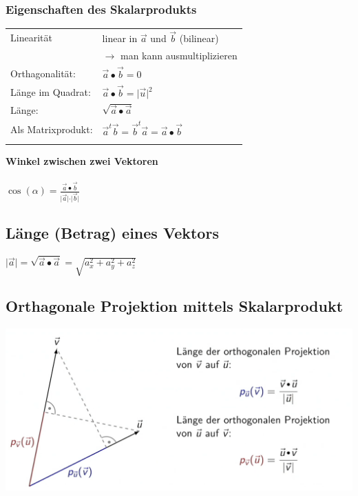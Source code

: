 			

			\subsubsection{Eigenschaften des Skalarprodukts}
			
			\begin{tabular}{ll}
			Linearität & linear in $\vec{a}$ und $\vec{b}$ (bilinear) \\
			& $\rightarrow$ man kann ausmultiplizieren\\
			
			Orthagonalität: &  $\vec{a} \bullet \vec{b} = 0$ \\
			
			Länge im Quadrat: & $\vec{a} \bullet \vec{b} = \vert \vec{u} \vert ^2$ 	\\
						
			Länge: &$\sqrt{\vec{a} \bullet \vec{a}}$ \\
			
			Als Matrixprodukt: & $\vec{a}^t \vec{b} = \vec{b}^t \vec{a} = \vec{a} \bullet \vec{b}$ \\
			\\
			\end{tabular}
			
			\textbf{Winkel zwischen zwei Vektoren} \\
			\\
			$\cos(\alpha) = \frac{\vec{a} \bullet \vec{b}}{ \vert \vec{a} \vert \cdot \vert \vec{b} \vert}$ \\
			
			
			 
		    \subsection{Länge (Betrag) eines Vektors}
		    $\vert \vec{a} \vert = \sqrt{\vec{a} \bullet \vec{a}} = \sqrt{a_x^2 + a_y^2 + a_z^2}$
		    
		    
		    
		    
		    
			
			\subsection{Orthagonale Projektion mittels Skalarprodukt}
			\includegraphics[width=0.65\linewidth]{Bilder/orthagonale-projektion}
			
